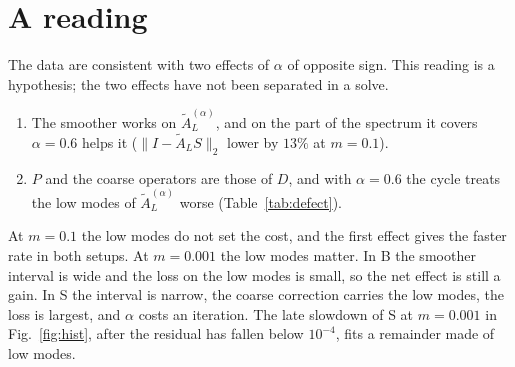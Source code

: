 \documentclass[11pt,a4paper]{article}
\newcommand{\AL}{\tilde A_{L}}
\begin{document}
\section{A reading}
The data are consistent with two effects of $\alpha$ of opposite sign. This reading is a
hypothesis; the two effects have not been separated in a solve.
\begin{enumerate}
\item The smoother works on $\AL^{(\alpha)}$, and on the part of the spectrum it covers
$\alpha=0.6$ helps it ($\|I-\AL S\|_2$ lower by $13\%$ at $m=0.1$).
\item $P$ and the coarse operators are those of $D$, and with $\alpha=0.6$ the cycle treats
the low modes of $\AL^{(\alpha)}$ worse (Table~\ref{tab:defect}).
\end{enumerate}
At $m=0.1$ the low modes do not set the cost, and the first effect gives the faster rate in
both setups. At $m=0.001$ the low modes matter. In B the smoother interval is wide and the
loss on the low modes is small, so the net effect is still a gain. In S the interval is
narrow, the coarse correction carries the low modes, the loss is largest, and $\alpha$ costs
an iteration. The late slowdown of S at $m=0.001$ in Fig.~\ref{fig:hist}, after the
residual has fallen below $10^{-4}$, fits a remainder made of low modes.
\end{document}
